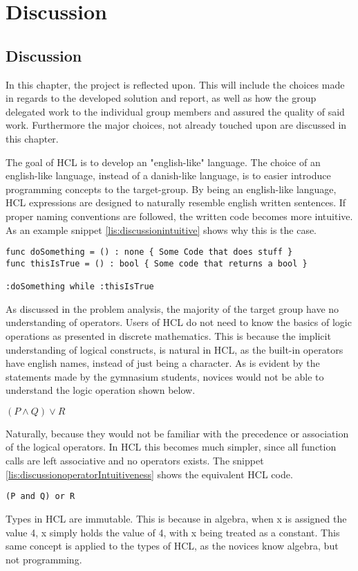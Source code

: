 
\chapter{Discussion}
\section{Discussion}
In this chapter, the project is reflected upon.
This will include the choices made in regards to the developed solution and report, as well as how the group delegated work to the individual group members and assured the quality of said work.
Furthermore the major choices, not already touched upon are discussed in this chapter.

The goal of HCL is to develop an "english-like" language.
The choice of an english-like language, instead of a danish-like language, is to easier introduce programming concepts to the target-group.
By being an english-like language, HCL expressions are designed to naturally resemble english written sentences.
If proper naming conventions are followed, the written code becomes more intuitive.
As an example snippet \ref{lis:discussionintuitive} shows why this is the case.

\begin{lstlisting}[language=HCL,label=lis:discussionintuitive,firstnumber=1,caption=Example of the intuitive nature of HCL]
func doSomething = () : none { Some Code that does stuff }
func thisIsTrue = () : bool { Some code that returns a bool }

:doSomething while :thisIsTrue
\end{lstlisting}

As discussed in the problem analysis, the majority of the target group have no understanding of operators.
Users of HCL do not need to know the basics of logic operations as presented in discrete mathematics.
This is because the implicit understanding of logical constructs, is natural in HCL, as the built-in operators have english names, instead of just being a character.
As is evident by the statements made by the gymnasium students, novices would not be able to understand the logic operation shown below.
\begin{center}
	$(P \wedge Q) \vee R$
\end{center}
Naturally, because they would not be familiar with the precedence or association of the logical operators.
In HCL this becomes much simpler, since all function calls are left associative and no operators exists.
The snippet \ref{lis:discussionoperatorIntuitiveness} shows the equivalent HCL code.
\begin{lstlisting}[language=HCL,label=lis:discussionoperatorIntuitiveness,firstnumber=1,caption=Example of the intuitive nature of HCL]
(P and Q) or R
\end{lstlisting}
Types in HCL are immutable.
This is because in algebra, when x is assigned the value 4, x simply holds the value of 4, with x being treated as a constant.
This same concept is applied to the types of HCL, as the novices know algebra, but not programming.

